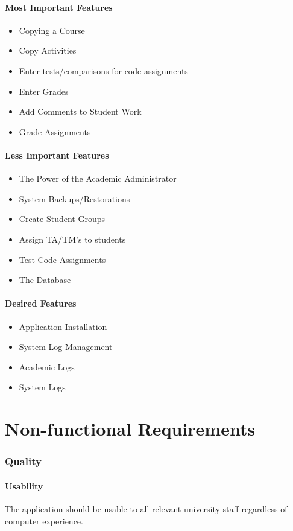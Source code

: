\documentclass{article}
\begin{document}
\subsection{Most Important Features}
\begin{itemize}
  \item Copying a Course
  \item Copy Activities
  \item Enter tests/comparisons for code assignments
  \item Enter Grades
  \item Add Comments to Student Work
  \item Grade Assignments
\end{itemize}

\subsection{Less Important Features}
\begin{itemize}
  \item The Power of the Academic Administrator
  \item System Backups/Restorations
  \item Create Student Groups
  \item Assign TA/TM's to students
  \item Test Code Assignments
  \item The Database
\end{itemize}

\subsection{Desired Features}
\begin{itemize}
  \item Application Installation
  \item System Log Management
  \item Academic Logs
  \item System Logs
\end{itemize}

\part{Non-functional Requirements}
\section{Quality}
\subsection{Usability}
The application should be usable to all relevant university staff
regardless of computer experience.
\end{document}
